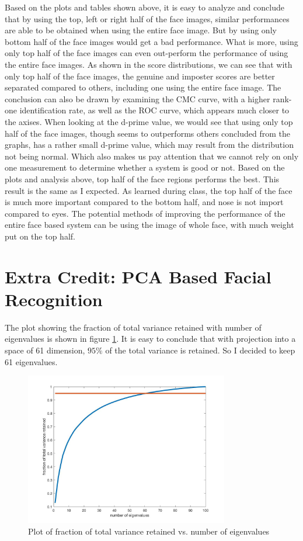 \documentclass[a4paper]{article}
\begin{document}
\begin{spacing}{2.0}
	Based on the plots and tables shown above, it is easy to analyze and conclude that by using the top, left or right half of the face images, similar performances are able to be obtained when using the entire face image. But by using only bottom half of the face images would get a bad performance. What is more, using only top half of the face images can even out-perform the performance of using the entire face images. As shown in the score distributions, we can  see that with only top half of the face images, the genuine and imposter scores are better separated compared to others, including one using the entire face image. The conclusion can also be drawn by examining the CMC curve, with a higher rank-one identification rate, as well as the ROC curve, which appears much closer to the axises. When looking at the d-prime value, we would see that using only top half of the face images, though seems to outperforms others concluded from the graphs, has a rather small d-prime value, which may result from the distribution not being normal. Which also makes us pay attention that we cannot rely on only one measurement to determine whether a system is good or not. Based on the plots and analysis above, top half of the face regions performs the best. This result is the same as I expected. As learned during class, the top half of the face is much more important compared to the bottom half, and nose is not import compared to eyes. The potential methods of improving the performance of the entire face based system can be using the image of whole face, with much weight put on the top half.


\newpage
\section*{\huge\textbf{Extra Credit: PCA Based Facial Recognition}}
	The plot showing the fraction of total variance retained with number of eigenvalues is shown in figure \ref{pca}. It is easy to conclude that with projection into a space of 61 dimension, $95\%$ of the total variance is retained. So I decided to keep 61 eigenvalues. 
	
	\begin{figure}[h]
	\centering
	\includegraphics[width = 3.5in]{PCA.jpg}
	\caption{Plot of fraction of total variance retained vs. number of eigenvalues}
	\label{pca}
	\end{figure}
	

\end{spacing}
\end{document}
